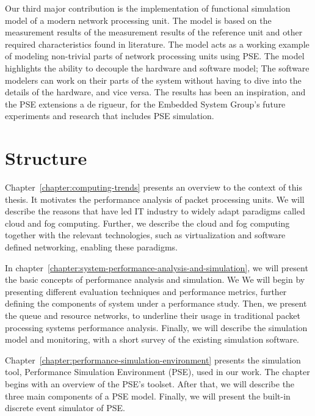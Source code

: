 Our third major contribution is the implementation of functional simulation model of a modern network processing unit. The model is based on the measurement results of the measurement results of the reference unit and other required characteristics found in literature. The model acts as a working example of modeling non-trivial parts of network processing units using PSE. The model highlights the ability to decouple the hardware and software model; The software modelers can work on their parts of the system without having to dive into the details of the hardware, and vice versa. The results has been an inspiration, and the PSE extensions a de rigueur, for the Embedded System Group's future experiments and research that includes PSE simulation.


\section{Structure}
Chapter~\ref{chapter:computing-trends} presents an overview to the context of this thesis. It motivates the performance analysis of packet processing units. We will describe the reasons that have led IT industry to widely adapt paradigms called cloud and fog computing. Further, we describe the cloud and fog computing together with the relevant technologies, such as virtualization and software defined networking, enabling these paradigms.


In chapter~\ref{chapter:system-performance-analysis-and-simulation}, we will present the basic concepts of performance analysis and simulation. We We will begin by presenting different evaluation techniques and performance metrics, further defining the components of system under a performance study. Then, we present the queue and resource networks, to underline their usage in traditional packet processing systems performance analysis. Finally, we will describe the simulation model and monitoring, with a short survey of the existing simulation software.

Chapter~\ref{chapter:performance-simulation-environment} presents the simulation tool, Performance Simulation Environment (PSE), used in our work. The chapter begins with an overview of the PSE's toolset. After that, we will describe the three main components of a PSE model. Finally, we will present the built-in discrete event simulator of PSE.

